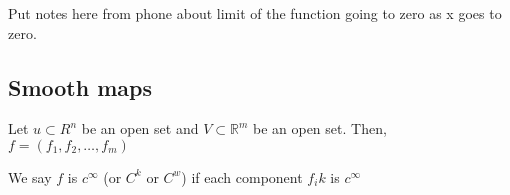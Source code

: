\documentclass[12pt,letterpaper]{article}
\begin{document}
Put notes here from phone about limit of the function going to zero as x goes to zero.

\subsection{Smooth maps }
Let $u \subset R^n$ be an open set and $V \subset \mathbb{R}^m$ be an open set. Then, $f = (f_1, f_2, \dots, f_m)$

We say $f$ is $c^{\infty}$ (or $C^k$ or $C^w$) if each component $f_i k$ is $c^{\infty}$
\end{document}
